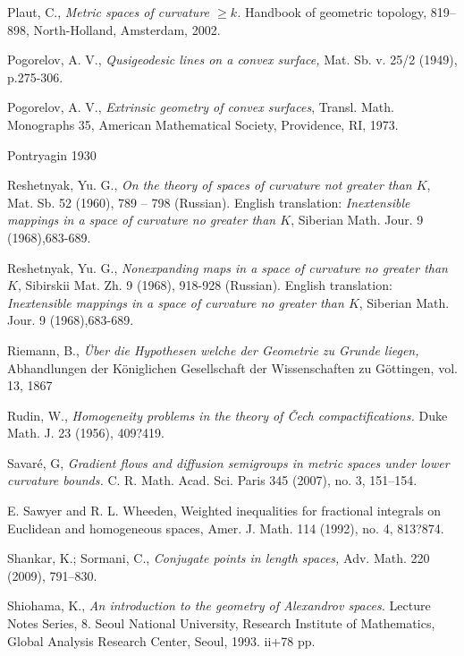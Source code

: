 \begin{thebibliography}{52}
Plaut, C., \textit{Metric spaces of curvature $\ge k$.} 
Handbook of geometric topology,  819--898, North-Holland, Amsterdam, 2002.

 Pogorelov, A. V., \textit{Qusigeodesic lines on a convex surface,} Mat. Sb. v. 25/2
(1949), p.275-306.

  Pogorelov, A. V., 
\textit{Extrinsic geometry of convex surfaces}, 
Transl. Math. Monographs 35, 
American Mathematical Society, Providence, RI, 1973.


 Pontryagin 1930

Reshetnyak, Yu. G.,
\textit{On the theory of spaces of curvature not greater than $K$},
 Mat. Sb. 52 (1960), 789 -- 798 (Russian).
English translation: \textit{Inextensible mappings in a space of curvature
no greater than $K$}, Siberian Math. Jour. 9 (1968),683-689.

Reshetnyak, Yu. G.,
\textit{Nonexpanding maps in a space of curvature no greater than $K$},
Sibirskii Mat. Zh. 9 (1968), 918-928 (Russian).
English translation: \textit{Inextensible mappings in a space of curvature
no greater than $K$}, Siberian Math. Jour. 9 (1968),683-689.


 Riemann, B., \textit{\"Uber die Hypothesen welche der Geometrie zu Grunde liegen,}
Abhandlungen der K\"oniglichen Gesellschaft der Wissenschaften zu G\"ottingen, vol. 13, 1867

Rudin, W.,
\textit{Homogeneity problems in the theory of \v{C}ech compactifications.}
Duke Math. J. 23 (1956), 409?419. 

Savar\'e, G, \textit{Gradient flows and diffusion semigroups in metric spaces under lower curvature bounds.}  C. R. Math. Acad. Sci. Paris  345  (2007),  no. 3, 151--154. 

 E. Sawyer and R. L. Wheeden, Weighted inequalities for fractional integrals on Euclidean and homogeneous spaces, Amer. J. Math. 114 (1992), no. 4, 813?874.

Shankar, K.; Sormani, C., \textit{Conjugate points in length spaces,} 
Adv. Math. 220 (2009), 791--830.

Shiohama, K., \textit{An introduction to the geometry of
Alexandrov spaces.} Lecture Notes Series, 8. Seoul National University, Research
Institute of Mathematics, Global Analysis Research Center, Seoul, 1993. ii+78
pp.


\end{thebibliography}
